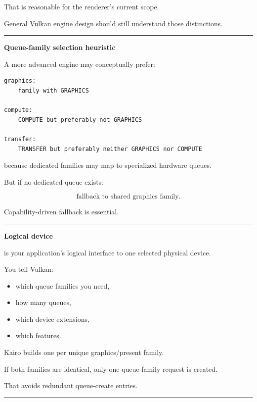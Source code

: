 That is reasonable for the renderer's current scope.

General Vulkan engine design should still understand those distinctions.

\begin{center}\rule{0.5\linewidth}{0.5pt}\end{center}

\textbf{Queue-family selection heuristic}

A more advanced engine may conceptually prefer:

\begin{verbatim}
graphics:
    family with GRAPHICS

compute:
    COMPUTE but preferably not GRAPHICS

transfer:
    TRANSFER but preferably neither GRAPHICS nor COMPUTE
\end{verbatim}

because dedicated families may map to specialized hardware queues.

But if no dedicated queue exists:

\[
\boxed{
\text{fallback to shared graphics family}.
}
\]

Capability-driven fallback is essential.

\begin{center}\rule{0.5\linewidth}{0.5pt}\end{center}

\textbf{Logical device}

 is your application's logical interface to one selected physical device.

You tell Vulkan:

\begin{itemize}
\tightlist
\item
  which queue families you need,
\item
  how many queues,
\item
  which device extensions,
\item
  which features.
\end{itemize}

Kairo builds one  per unique graphics/present family.

If both families are identical, only one queue-family request is created.

That avoids redundant queue-create entries.

\begin{center}\rule{0.5\linewidth}{0.5pt}\end{center}


